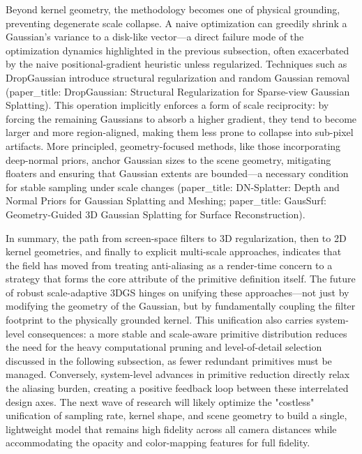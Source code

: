 \documentclass[11pt,a4paper]{article}
\begin{document}
Beyond kernel geometry, the methodology becomes one of physical grounding, preventing degenerate scale collapse. A naive optimization can greedily shrink a Gaussian's variance to a disk-like vector---a direct failure mode of the optimization dynamics highlighted in the previous subsection, often exacerbated by the naive positional-gradient heuristic unless regularized. Techniques such as DropGaussian introduce structural regularization and random Gaussian removal (paper\_title: DropGaussian: Structural Regularization for Sparse-view Gaussian Splatting). This operation implicitly enforces a form of scale reciprocity: by forcing the remaining Gaussians to absorb a higher gradient, they tend to become larger and more region-aligned, making them less prone to collapse into sub-pixel artifacts. More principled, geometry-focused methods, like those incorporating deep-normal priors, anchor Gaussian sizes to the scene geometry, mitigating floaters and ensuring that Gaussian extents are bounded---a necessary condition for stable sampling under scale changes (paper\_title: DN-Splatter: Depth and Normal Priors for Gaussian Splatting and Meshing; paper\_title: GausSurf: Geometry-Guided 3D Gaussian Splatting for Surface Reconstruction).

In summary, the path from screen-space filters to 3D regularization, then to 2D kernel geometries, and finally to explicit multi-scale approaches, indicates that the field has moved from treating anti-aliasing as a render-time concern to a strategy that forms the core attribute of the primitive definition itself. The future of robust scale-adaptive 3DGS hinges on unifying these approaches---not just by modifying the geometry of the Gaussian, but by fundamentally coupling the filter footprint to the physically grounded kernel. This unification also carries system-level consequences: a more stable and scale-aware primitive distribution reduces the need for the heavy computational pruning and level-of-detail selection discussed in the following subsection, as fewer redundant primitives must be managed. Conversely, system-level advances in primitive reduction directly relax the aliasing burden, creating a positive feedback loop between these interrelated design axes. The next wave of research will likely optimize the "costless" unification of sampling rate, kernel shape, and scene geometry to build a single, lightweight model that remains high fidelity across all camera distances while accommodating the opacity and color-mapping features for full fidelity.
\end{document}
